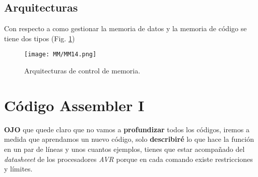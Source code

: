 \documentclass[
	12pt, %
	fleqn, %
	a4paper, %
	oneside, %
]{LegrandOrangeBook}
\begin{document}
\subsection{Arquitecturas}
Con respecto a como gestionar la memoria de datos y la memoria de código se tiene dos tipos (Fig. \ref{fig: arch memoria})
\begin{figure}[]
\centering
\texttt{[image: MM/MM14.png]}
\caption{Arquitecturas de control de memoria.}
\label{fig: arch memoria}
\end{figure}
\section{Código Assembler I}
\textbf{OJO} que quede claro que no vamos a \textbf{profundizar} todos los códigos, iremos a medida que aprendamos un nuevo código, solo \textbf{describiré} lo que hace la función en un par de líneas y unos cuantos ejemplos, tienes que estar acompañado del \textit{datasheeet} de los procesadores \textit{AVR} porque en cada comando existe restricciones y límites.
\end{document}
